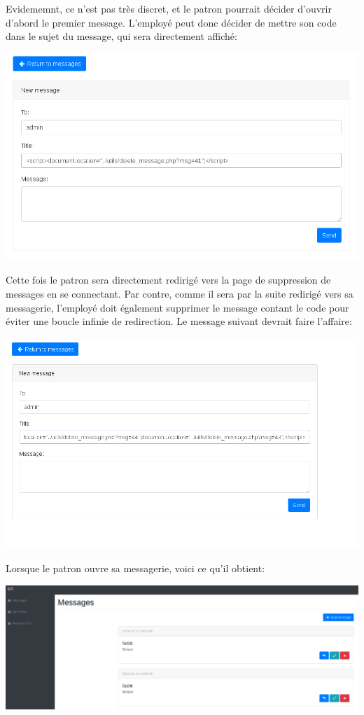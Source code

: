 \documentclass{article}
\begin{document}
Evidememnt, ce n'est pas très discret, et le patron pourrait décider
d'ouvrir d'abord le premier message. L'employé peut donc décider de
mettre son code dans le sujet du message, qui sera directement affiché:

\includegraphics[width=\textwidth]{images/delete5.PNG}

Cette fois le patron sera directement redirigé vers la page de
suppression de messages en se connectant. Par contre, comme il sera par
la suite redirigé vers sa messagerie, l'employé doit également supprimer
le message contant le code pour éviter une boucle infinie de
redirection. Le message suivant devrait faire l'affaire:

\includegraphics[width=\textwidth]{images/delete7.PNG}

Lorsque le patron ouvre sa messagerie, voici ce qu'il obtient:

\includegraphics[width=\textwidth]{images/delete8.PNG}
\end{document}
